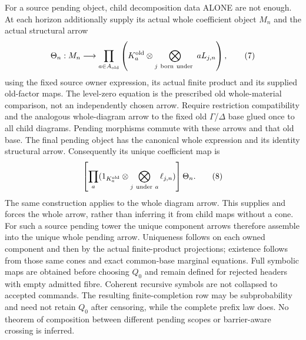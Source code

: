 \documentclass[11pt]{article}
\begin{document}
For a source pending object, child decomposition data ALONE are not enough. At each horizon additionally supply its actual whole coefficient object $M_n$ and the actual structural arrow
\[
 \Theta_n:M_n\longrightarrow
 \prod_{a\in A_{\rm old}}\left(K_a^{\rm old}\otimes
           \bigotimes_{j\ \rm born\ under\ }a L_{j,n}\right), \tag{7}
\]
using the fixed source owner expression, its actual finite product and its supplied old-factor maps. The level-zero equation is the prescribed old whole-material comparison, not an independently chosen arrow. Require restriction compatibility and the analogous whole-diagram arrow to the fixed old $\Gamma$/$\Delta$ base glued once to all child diagrams. Pending morphisms commute with these arrows and that old base. The final pending object has the canonical whole expression and its identity structural arrow. Consequently its unique coefficient map is
\[
 \left[\prod_a(1_{K_a^{\rm old}}\otimes\bigotimes_{j\ {\rm under}\ a}
                 \ell_{j,n})\right]\Theta_n .             \tag{8}
\]
The same construction applies to the whole diagram arrow. This supplies and forces the whole arrow, rather than inferring it from child maps without a cone. For such a source pending tower the unique component arrows therefore assemble into the unique whole pending arrow. Uniqueness follows on each owned component and then by the actual finite-product projections; existence follows from those same cones and exact common-base marginal equations. Full symbolic maps are obtained before choosing $Q_0$ and remain defined for rejected headers with empty admitted fibre. Coherent recursive symbols are not collapsed to accepted commands. The resulting finite-completion row may be subprobability and need not retain $Q_0$ after censoring, while the complete prefix law does. No theorem of composition between different pending scopes or barrier-aware crossing is inferred.
\end{document}
